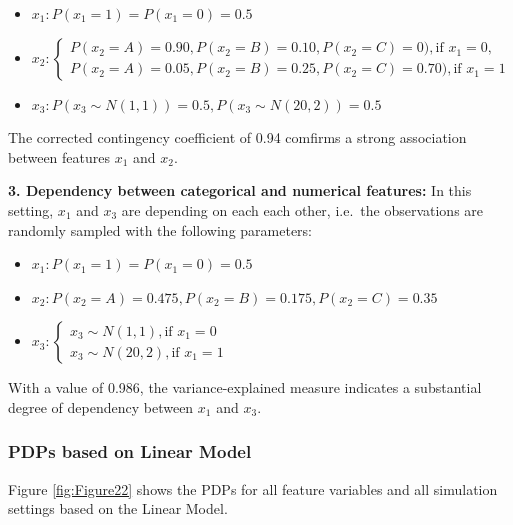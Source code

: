 \documentclass[]{krantz}
\providecommand{\tightlist}{%
  \setlength{\itemsep}{0pt}\setlength{\parskip}{0pt}}
\begin{document}
\begin{itemize}
\tightlist
\item
  \(x_1: P(x_1=1)=P(x_1=0)=0.5\)
\item
  \(x_2: \begin{cases} P(x_2=A)=0.90, P(x_2=B)=0.10, P(x_2=C)=0), \text{if } x_1=0, \\ P(x_2=A)=0.05, P(x_2=B)=0.25, P(x_2=C)=0.70), \text{if } x_1=1 \end{cases}\)
\item
  \(x_3: P(x_3 \sim N(1,1))=0.5, P(x_3 \sim N(20,2))=0.5\)
\end{itemize}

The corrected contingency coefficient of 0.94 comfirms a strong
association between features \(x_1\) and \(x_2\).

\textbf{3. Dependency between categorical and numerical features:} In
this setting, \(x_1\) and \(x_3\) are depending on each each other,
i.e.~the observations are randomly sampled with the following
parameters:

\begin{itemize}
\tightlist
\item
  \(x_1: P(x_1=1)=P(x_1=0)=0.5\)
\item
  \(x_2: P(x_2=A)=0.475, P(x_2=B)=0.175, P(x_2=C)=0.35\)
\item
  \(x_3: \begin{cases} x_3 \sim N(1,1), \text{if } x_1=0 \\ x_3 \sim N(20,2), \text{if } x_1=1 \end{cases}\)
\end{itemize}

With a value of 0.986, the variance-explained measure indicates a
substantial degree of dependency between \(x_1\) and \(x_3\).

\subsubsection{PDPs based on Linear
Model}\label{pdps-based-on-linear-model-2}

Figure \ref{fig:Figure22} shows the PDPs for all feature variables and
all simulation settings based on the Linear Model.
\end{document}
